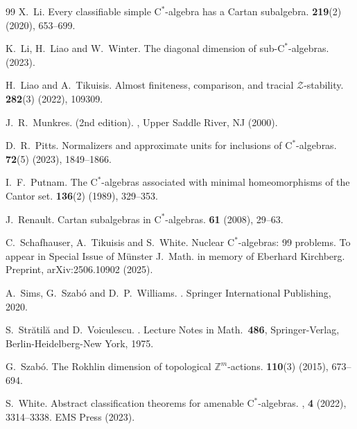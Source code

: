 \documentclass[11pt,a4paper]{amsart}
\theoremstyle{definition}
\numberwithin{equation}{section}
\newcommand{\mc}[1]{\mathcal{#1}}
\begin{document}
\begin{thebibliography}{99}
X.\ Li.
\newblock Every classifiable simple $\mathrm{C}^*$-algebra has a Cartan subalgebra.
 {\bf 219}(2) (2020), 653--699.



K.\ Li, H.\ Liao and W.\ Winter.
\newblock The diagonal dimension of sub-$\mathrm{C}^*$-algebras.
 (2023).

H.\ Liao and A.\ Tikuisis.
\newblock Almost finiteness, comparison, and tracial $\mc{Z}$-stability.
 {\bf 282}(3) (2022), 109309.

J.\ R.\ Munkres.
 (2nd edition).
, Upper Saddle River, NJ (2000).

D.\ R.\ Pitts.
\newblock Normalizers and approximate units for inclusions of $\mathrm{C}^*$-algebras.
 {\bf 72}(5) (2023), 1849--1866.

I.\ F.\ Putnam.
\newblock The $\mathrm{C}^\ast$-algebras associated with minimal homeomorphisms of the Cantor set.
 {\bf 136}(2) (1989), 329--353.

J.\ Renault.
\newblock Cartan subalgebras in $\mathrm{C}^*$-algebras.
 {\bf 61} (2008), 29--63.

C.\ Schafhauser, A.\ Tikuisis and S.\ White.
\newblock Nuclear $\mathrm{C}^\ast$-algebras: 99 problems.
\newblock To appear in Special Issue of M{\"u}nster J.\ Math. in memory of Eberhard Kirchberg. {Preprint, arXiv:2506.10902} (2025).

A.\ Sims, G.\ Szab{\'o} and D.\ P.\ Williams.
.
\newblock Springer International Publishing, 2020.


S.\ Str\u{a}til\u{a} and D.\ Voiculescu.
.
\newblock Lecture Notes in Math.\ {\bf 486}, Springer-Verlag, Berlin-Heidelberg-New York, 1975.

G.\ Szab{\'o}.
\newblock The Rokhlin dimension of topological $\mathbb{Z}^m$-actions.
 {\bf 110}(3) (2015), 673--694.


S.\ White.
\newblock Abstract classification theorems for amenable $\mathrm{C}^\ast$-algebras.
, {\bf 4} (2022), 3314--3338. EMS Press (2023).


\end{thebibliography}
\end{document}
